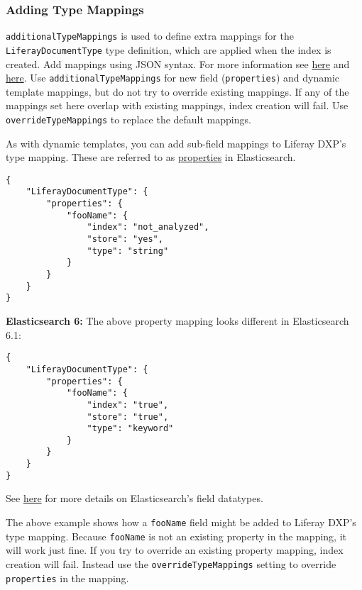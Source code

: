 \subsubsection{Adding Type Mappings}\label{adding-type-mappings}

\texttt{additionalTypeMappings} is used to define extra mappings for the
\texttt{LiferayDocumentType} type definition, which are applied when the
index is created. Add mappings using JSON syntax. For more information
see
\href{https://www.elastic.co/guide/en/elasticsearch/reference/2.4/mapping.html}{here}
and
\href{https://www.elastic.co/guide/en/elasticsearch/reference/2.4/indices-put-mapping.html}{here}.
Use \texttt{additionalTypeMappings} for new field (\texttt{properties})
and dynamic template mappings, but do not try to override existing
mappings. If any of the mappings set here overlap with existing
mappings, index creation will fail. Use \texttt{overrideTypeMappings} to
replace the default mappings.

As with dynamic templates, you can add sub-field mappings to Liferay
DXP's type mapping. These are referred to as
\href{https://www.elastic.co/guide/en/elasticsearch/reference/2.4/properties.html}{properties}
in Elasticsearch.

\begin{verbatim}
{ 
    "LiferayDocumentType": {  
        "properties": {   
            "fooName": {
                "index": "not_analyzed",
                "store": "yes",
                "type": "string"
            }
        }   
    }
}
\end{verbatim}

\textbf{Elasticsearch 6:} The above property mapping looks different in
Elasticsearch 6.1:

\begin{verbatim}
{ 
    "LiferayDocumentType": {  
        "properties": {   
            "fooName": {
                "index": "true",
                "store": "true",
                "type": "keyword"
            }
        }   
    }
}
\end{verbatim}

See
\href{https://www.elastic.co/guide/en/elasticsearch/reference/6.1/mapping-types.html}{here}
for more details on Elasticsearch's field datatypes.

The above example shows how a \texttt{fooName} field might be added to
Liferay DXP's type mapping. Because \texttt{fooName} is not an existing
property in the mapping, it will work just fine. If you try to override
an existing property mapping, index creation will fail. Instead use the
\texttt{overrideTypeMappings} setting to override \texttt{properties} in
the mapping.

